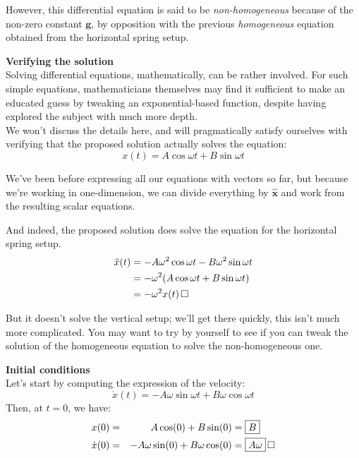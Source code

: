 \documentclass[solutions.tex]{subfiles}
\renewcommand{\bm}[1]{\pmb{#1}}
\renewcommand{\qed}{\,\relax\ifmmode\Box\else$\Box$\fi}
\begin{document}
\begin{remark} However, this differential equation is said to be
\textit{non-homogeneous} because of the non-zero constant $\bm{g}$, by
opposition with the previous \textit{homogeneous} equation obtained
from the horizontal spring setup.
\end{remark}
\hr
\textbf{Verifying the solution} \\
Solving differential equations, mathematically, can be rather
involved. For such simple equations, mathematicians themselves
may find it sufficient to make an educated guess by tweaking
an exponential-based function, despite having explored the
subject with much more depth. \\

We won't discuss the details here, and will pragmatically
satisfy ourselves with verifying that the proposed solution actually
solves the equation:
\[x(t) = A\cos\omega t + B\sin\omega t \]
\begin{remark} We've been before expressing all our equations with
vectors so far, but because we're working in one-dimension, we can
divide everything by $\bm{\hat{x}}$ and work from the resulting
scalar equations.
\end{remark}
And indeed, the proposed solution does solve the equation
for the horizontal spring setup.
\begin{align*}
	\ddot x(t) &= -A\omega^2\cos\omega t - B\omega^2\sin\omega t \\
	~ &= -\omega^2 (A\cos\omega t + B\sin\omega t) \\
	~ &= -\omega^2 x(t) \qed
\end{align*}

But it doesn't solve the vertical setup; we'll get there quickly,
this isn't much more complicated. You may want to try by yourself
to see if you can tweak the solution of the homogeneous equation
to solve the non-homogeneous one.

\hr
\textbf{Initial conditions} \\
Let's start by computing the expression of the velocity:
\[ \dot x(t) = -A\omega\sin\omega t + B\omega\cos\omega t \]
Then, at $t=0$, we have:
\begin{equation*} \begin{aligned}
	x(0) = && A\cos(0) + B\sin(0) &= \boxed{B} \\
	\dot x(0) = && -A\omega\sin(0) + B\omega\cos(0) &= \boxed{A\omega}\qed
\end{aligned} \end{equation*}
\end{document}
